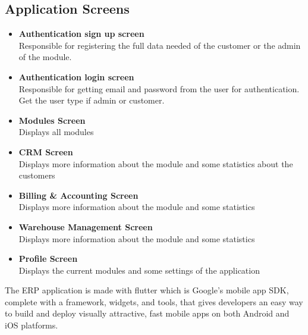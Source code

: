 \subsection{Application Screens}
\begin{itemize}
    \item \textbf{Authentication sign up screen}\\ Responsible for registering the full data needed of the customer or the admin of the
    module.
    \item \textbf{Authentication login screen}\\ Responsible for getting email and password from the user for authentication.
    Get the user type if admin or customer.
    \item \textbf{Modules Screen}\\ Displays all modules
    \item \textbf{CRM Screen}\\ Displays more information about the module and some statistics about the customers
    \item \textbf{Billing \& Accounting Screen}\\ Displays more information about the module and some statistics
    \item \textbf{Warehouse Management Screen}\\ Displays more information about the module and some statistics
    \item \textbf{Profile Screen}\\ Displays the current modules and some settings of the application

\end{itemize}

The ERP application is made with flutter which is Google’s mobile app SDK, complete with a
framework, widgets, and tools, that gives developers an easy way to build and deploy visually
attractive, fast mobile apps on both Android and iOS platforms.
